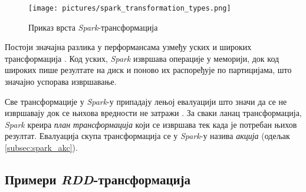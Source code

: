 \documentclass[12pt,oneside]{memoir}
\begin{document}
\begin{figure}[!ht]
  \centering
  \texttt{[image: pictures/spark\_transformation\_types.png]}
  \caption{Приказ врста \textit{Spark}-трансформација}
  \label{fig:sprk_trnsf}
\end{figure}

Постоји значајна разлика у перформансама узмеђу уских и широких трансформација \cite{spark_guide}. Код уских, \textit{Spark} извршава операције у меморији, док код широких пише резултате на диск и поново их распоређује по партицијама, што значајно успорава извршавање.

Све трансформације у \textit{Spark}-у припадају лењој евалуацији што значи да се не извршавају док се њихова вредности не затражи \cite{spark_guide}. За сваки ланац трансформација, \textit{Spark} креира \textit{план трансформација} који се извршава тек када је потребан њихов резултат. Евалуација скупа трансформација се у \textit{Spark}-у назива \textit{акција} (одељак \ref{subsec:spark_akc}).




\subsection{Примери \textit{RDD}-трансформација}
\label{subsec:spark_transformation_types}
\end{document}
